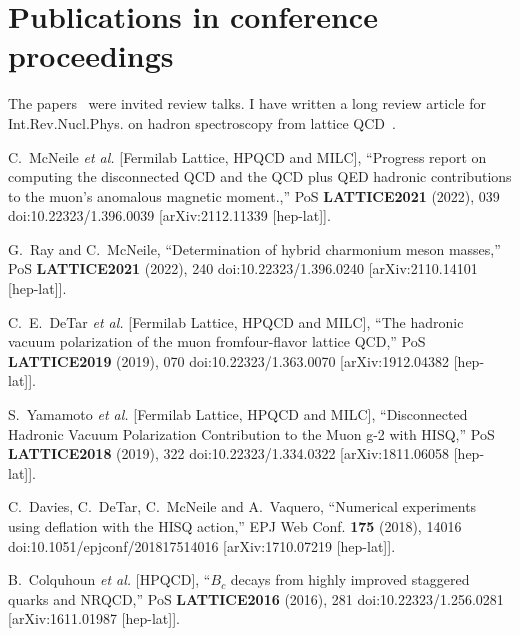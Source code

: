 \section{Publications in conference proceedings}

The 
papers~\cite{McNeile:2013rga,McNeile:2008sr,McNeile:2007qf,McNeile:2006wj,McNeile:2002uy,McNeile:2002en,McNeile:2001hy,McNeile:1999gk} 
were invited review
talks. 
I have written a long review article for Int.Rev.Nucl.Phys. 
on hadron spectroscopy from lattice 
QCD~\cite{McNeile:2003dy}.


\begin{thebibliography}{130}

C.~McNeile \textit{et al.} [Fermilab Lattice, HPQCD and MILC],
``Progress report on computing the disconnected QCD and the QCD plus
QED hadronic contributions to the muon\textquoteright{}s anomalous
magnetic moment.,''
PoS \textbf{LATTICE2021} (2022), 039
doi:10.22323/1.396.0039
[arXiv:2112.11339 [hep-lat]].

G.~Ray and C.~McNeile,
``Determination of hybrid charmonium meson masses,''
PoS \textbf{LATTICE2021} (2022), 240
doi:10.22323/1.396.0240
[arXiv:2110.14101 [hep-lat]].


C.~E.~DeTar \textit{et al.} [Fermilab Lattice, HPQCD and MILC],
``The hadronic vacuum polarization of the muon fromfour-flavor
lattice QCD,''
PoS \textbf{LATTICE2019} (2019), 070
doi:10.22323/1.363.0070
[arXiv:1912.04382 [hep-lat]].

S.~Yamamoto \textit{et al.} [Fermilab Lattice, HPQCD and MILC],
``Disconnected Hadronic Vacuum Polarization Contribution to the Muon
g-2 with HISQ,''
PoS \textbf{LATTICE2018} (2019), 322
doi:10.22323/1.334.0322
[arXiv:1811.06058 [hep-lat]].


C.~Davies, C.~DeTar, C.~McNeile and A.~Vaquero,
``Numerical experiments using deflation with the HISQ action,''
EPJ Web Conf. \textbf{175} (2018), 14016
doi:10.1051/epjconf/201817514016
[arXiv:1710.07219 [hep-lat]].


B.~Colquhoun \textit{et al.} [HPQCD],
``$B_c$ decays from highly improved staggered quarks and NRQCD,''
PoS \textbf{LATTICE2016} (2016), 281
doi:10.22323/1.256.0281
[arXiv:1611.01987 [hep-lat]].


\end{thebibliography}
